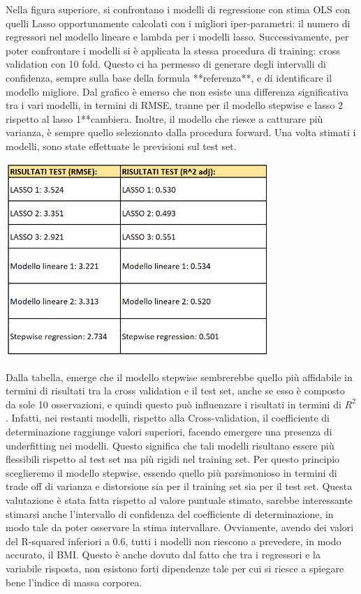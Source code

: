 Nella figura superiore, si confrontano i modelli di regressione con stima OLS con quelli Lasso opportunamente calcolati con i migliori iper-parametri: il numero di regressori nel modello lineare e lambda per i modelli lasso.  Successivamente, per poter confrontare i modelli si è applicata la stessa procedura di training: cross validation con 10 fold. Questo ci ha permesso di generare degli intervalli di confidenza, sempre sulla base della formula **referenza**, e di identificare il modello migliore. Dal grafico è emerso che non esiste una differenza significativa tra i vari modelli, in termini di RMSE, tranne per il modello stepwise  e lasso 2 rispetto al lasso 1**cambiera. Inoltre, il modello che riesce a catturare più varianza, è sempre quello selezionato dalla procedura forward. Una volta stimati i modelli, sono state effettuate le previsioni sul test set. 
  \vspace*{1cm}
\begin{Figure}
    \centering
    \includegraphics[width=10cm,keepaspectratio]{images/tabella_modelli.PNG}
  \end{Figure}
  \vspace*{1cm}
Dalla tabella, emerge che il modello stepwise sembrerebbe quello più affidabile in termini di risultati tra la cross validation e il test set, anche se esso è composto da sole 10 osservazioni, e quindi questo può influenzare i risultati in termini di $R^2$. Infatti, nei restanti modelli, rispetto alla Cross-validation, il coefficiente di determinazione raggiunge valori superiori, facendo emergere una presenza di underfitting nei modelli. Questo significa che tali modelli risultano essere più flessibili rispetto al test set ma più rigidi nel training set. Per questo principio sceglieremo il modello stepwise, essendo quello più parsimonioso in termini di trade off di varianza e distorsione sia per il training set sia per il test set. Questa valutazione è stata fatta rispetto al valore puntuale stimato, sarebbe interessante stimarsi anche l’intervallo di confidenza del coefficiente di determinazione, in modo tale da poter osservare la stima intervallare. Ovviamente, avendo dei valori del R-squared inferiori a 0.6, tutti i modelli non riescono a prevedere, in modo accurato, il BMI. Questo è anche dovuto dal fatto che tra i regressori e la variabile risposta, non esistono forti dipendenze tale per cui si riesce a spiegare bene l’indice di massa corporea. 

